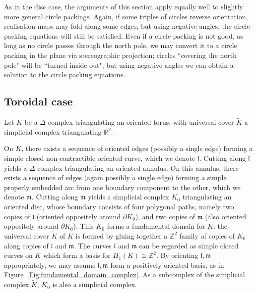 \documentclass[12pt]{amsart}
\numberwithin{equation}{section}
\theoremstyle{named}
\newcommand{\reffig}[1]{Figure~\ref{Fig:#1}}
\newcommand{\R}{\mathbb{R}}
\newcommand{\Z}{\mathbb{Z}}
\begin{document}
As in the disc case, the arguments of this section apply equally well to slightly more general circle packings. Again, if some triples of circles reverse orientation, realisation maps may fold along some edges, but using negative angles, the circle packing equations will still be satisfied. Even if a circle packing is not good, as long as no circle passes through the north pole, we may convert it to a circle packing in the plane via stereographic projection; circles ``covering the north pole" will be ``turned inside out", but using negative angles we can obtain a solution to the circle packing equations.

\subsection{Toroidal case}
\label{Sec:torus_eqns_satisfied}

 
Let $K$ be a $\Delta$-complex triangulating an oriented torus, with universal cover $\widetilde{K}$ a simplicial complex triangulating $\R^2$.

On $K$, there exists a sequence of oriented edges (possibly a single edge) forming a simple closed non-contractible oriented curve, which we denote $\mathfrak{l}$. Cutting along $\mathfrak{l}$ yields a $\Delta$-complex triangulating an oriented annulus. On this annulus, there exists a sequence of edges (again possibly a single edge) forming a simple properly embedded arc from one boundary component to the other, which we denote $\mathfrak{m}$. Cutting along $\mathfrak{m}$ yields a simplicial complex $K_0$ triangulating an oriented disc, whose boundary consists of four polygonal paths, namely two copies of $\mathfrak{l}$ (oriented oppositely around $\partial K_0$), and two copies of $\mathfrak{m}$ (also oriented oppositely around $\partial K_0$). This $K_0$ forms a fundamental domain for $K$: the universal cover $\widetilde{K}$ of $K$ is formed by gluing together a $\Z^2$ family of copies of $K_0$ along copies of $\mathfrak{l}$ and $\mathfrak{m}$. The curves $\mathfrak{l}$ and $\mathfrak{m}$ can be regarded as simple closed curves on $K$ which form a basis for $H_1 (K) \cong \Z^2$. By orienting $\mathfrak{l},\mathfrak{m}$ appropriately, we may assume $\mathfrak{l},\mathfrak{m}$ form a positively oriented basis, as in \reffig{fundamental_domain_complex}. As a subcomplex of the simplicial complex $\widetilde{K}$, $K_0$ is also a simplicial complex. 
\end{document}

